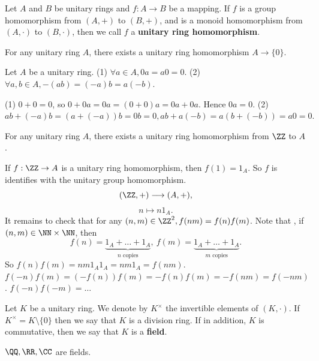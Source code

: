 \begin{definitionenv}
    Let $A$ and $B$ be unitary rings and $f:A\rightarrow B$ be a mapping. If $f$ is a group homomorphism from $(A, +)$ to $(B, +)$,  and is a monoid homomorphism from $(A, \cdot)$ to $(B, \cdot)$,  then we call $f$ a \textbf{unitary ring homomorphism}. 
\end{definitionenv}
\begin{propositionenv}
    For any unitary ring $A$,  there exists a unitary ring homomorphism $A\rightarrow\{0\}$.
\end{propositionenv}
\begin{lemmaenv}
    Let $A$ be a unitary ring.
    \newline
    (1) $\forall a\in A,  0a=a0=0.$
    \newline
    (2) $\forall a, b\in A,  -(ab)=(-a)b=a(-b).$
\end{lemmaenv}
\begin{proofenv}
    \quad\newline
    (1) $0+0=0$,  so $0+0a=0a=(0+0)a=0a+0a$. Hence $0a=0$.
    \newline
    (2) $ab+(-a)b=(a+(-a))b=0b=0, ab+a(-b)=a(b+(-b))=a0=0.$
\end{proofenv}
\begin{propositionenv}
    For any unitary ring $A$,  there exists a unitary ring homomorphism from $\ZZ$ to $A$.
\end{propositionenv}
\begin{proofenv}
    If $f:\ZZ \rightarrow A$ is a unitary ring homomorphism,  then $f(1)=1_A$. So $f$ is identifies with the unitary group homomorphism.
    $$(\ZZ, +)\longrightarrow(A, +), $$
    $$n\longmapsto n1_A.$$
    It remains to check that for any $(n, m)\in \ZZ^2, f(nm)=f(n)f(m)$. Note that ,  if $(n, m)\in \NN\times\NN$,  then 
    $$f(n)=\underset{n \text{ copies}}{\underbrace{1_A+\dots+1_A}}, \ f(m)=\underset{m \text{ copies}}{\underbrace{1_A+\dots+1_A}}.$$
    So $f(n)f(m)=nm1_A1_A=nm1_A=f(nm)$.
    $f(-n)f(m)=(-f(n))f(m)=-f(n)f(m)=-f(nm)=f(-nm)$.
    $f(-n)f(-m)=\dots$
\end{proofenv}
\begin{definitionenv}
    Let $K$ be a unitary ring. We denote by $K^\times$ the invertible elements of $(K, \cdot)$. If $K^\times=K\setminus\{0\}$ then we say that $K$ is a division ring. If in addition,  $K$ is commutative,  then we say that $K$ is a \textbf{field}.
\end{definitionenv}
\begin{exampleenv}
    $\QQ, \RR, \CC$ are fields.
\end{exampleenv}
